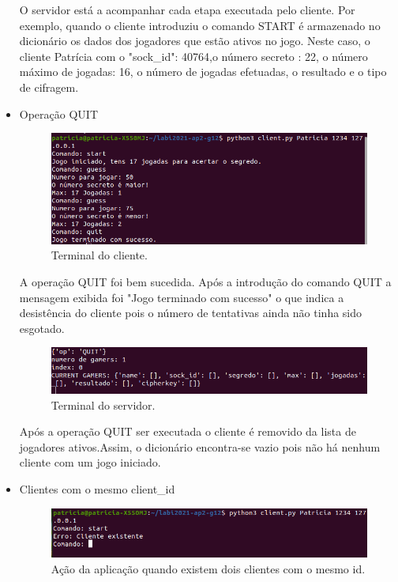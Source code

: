 \documentclass{report}
\begin{document}
\begin{itemize}
O servidor está a acompanhar cada etapa executada pelo cliente. Por exemplo, quando o cliente introduziu o comando START é armazenado no dicionário os dados dos jogadores que estão ativos no jogo. Neste caso, o cliente Patrícia com o "sock\_id": 40764,o número secreto : 22, o número máximo de jogadas: 16, o número de jogadas efetuadas, o resultado e o tipo de cifragem.

\item Operação QUIT
\begin{figure}[H]
        \centering
        \includegraphics[scale=0.53]{guesscomquit}      
        \caption{Terminal do cliente.}
\end{figure}

A operação QUIT foi bem sucedida. Após a introdução do comando QUIT a mensagem exibida foi "Jogo terminado com sucesso" o que indica a desistência do cliente pois o número de tentativas ainda não tinha sido esgotado.

\begin{figure}[H]
        \centering
        \includegraphics[scale=0.53]{guesscomquit1}      
        \caption{Terminal do servidor.}
\end{figure}

Após a operação QUIT ser executada o cliente é removido da lista de jogadores ativos.Assim, o dicionário encontra-se vazio pois não há nenhum cliente com um jogo iniciado.

\item Clientes com o mesmo client\_id
\begin{figure}[H]
        \centering
        \includegraphics[scale=0.53]{mesmonome}      
        \caption{Ação da aplicação quando existem dois clientes com o mesmo id.}
\end{figure}


\end{itemize}
\end{document}
